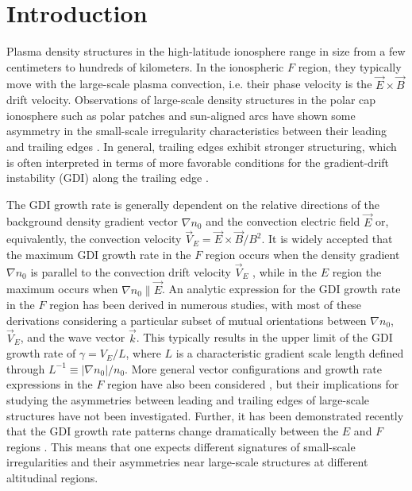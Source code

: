 \section{Introduction}
\label{sec:p2intro}
Plasma density structures in the high-latitude ionosphere range in size from a few centimeters to hundreds of kilometers. In the ionospheric \(F\) region, they typically move with the large-scale plasma convection, i.e. their phase velocity is the \(\vec{E}\times\vec{B}\) drift velocity.  Observations of large-scale density structures in the polar cap ionosphere such as polar patches and sun-aligned arcs have shown some asymmetry in the small-scale irregularity characteristics between their leading and trailing edges \citep[e.g.][]{Weber1984}. In general, trailing edges exhibit stronger structuring, which is often interpreted in terms of more favorable conditions for the gradient-drift instability (GDI) along the trailing edge \citep{Weber1984,Milan2002a, Koustov2012,Moen2012}.


The GDI growth rate is generally dependent on the relative directions of the background density gradient vector \(\nabla n_0\) and the convection electric field \(\vec{E}\) or, equivalently, the convection velocity \(\vec{V}_E=\vec{E}\times\vec{B}/B^2\). It is widely accepted that the maximum GDI growth rate in the \(F\) region occurs when the density gradient \(\nabla n_0\) is parallel to the convection drift velocity \(\vec{V}_E\) \citep{Keskinen1982a}, while in the \(E\) region the maximum occurs when \(\nabla n_0\parallel \vec{E}\). An analytic expression for the GDI growth rate in the \(F\) region has been derived in numerous studies, with most of these derivations considering a particular subset of mutual orientations between \(\nabla n_0\), \(\vec{V}_E\), and the wave vector \(\vec{k}\). This typically results in the upper limit of the GDI growth rate of \(\gamma=V_E/L\), where \(L\) is a characteristic gradient scale length defined through \(L^{-1}\equiv |\nabla n_0|/n_0\). More general vector configurations and growth rate expressions in the \(F\) region have also been considered \citep{Keskinen1982a,Makarevich2014c}, but their implications for studying the asymmetries between leading and trailing edges of large-scale structures have not been investigated. Further, it has been demonstrated recently that the GDI growth rate patterns change dramatically between the \(E\) and \(F\) regions \citep{Makarevich2014c}. This means that one expects different signatures of small-scale irregularities and their asymmetries near large-scale structures at different altitudinal regions.


